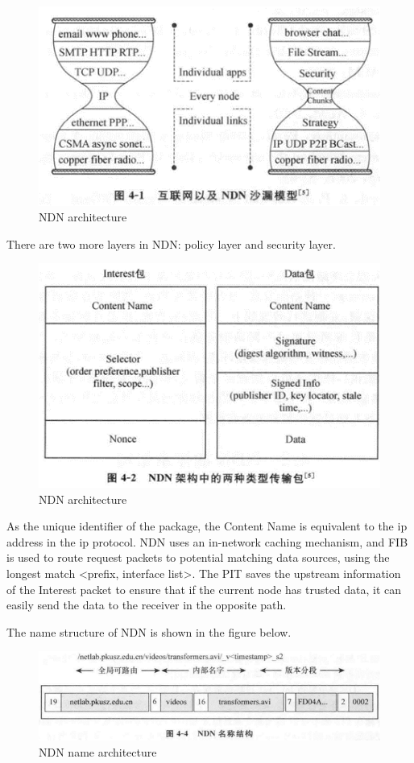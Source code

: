 \documentclass[conference]{IEEEtran}
\begin{document}
\begin{figure}[htbp]
    \centerline{\includegraphics{NDN architecture.png}}
    \caption{NDN architecture}
    \label{fig}
\end{figure}
There are two more layers in NDN: policy layer and security layer.

\begin{figure}[htbp]
    \centerline{\includegraphics{packet.png}}
    \caption{NDN architecture}
    \label{fig}
\end{figure}

As the unique identifier of the package, the Content Name is equivalent to the ip address in the ip protocol.
NDN uses an in-network caching mechanism, and FIB is used to route request packets to potential matching data sources, using the longest match <prefix, interface list>. The PIT saves the upstream information of the Interest packet to ensure that if the current node has trusted data, it can easily send the data to the receiver in the opposite path.


The name structure of NDN is shown in the figure below.
\begin{figure}[htbp]
    \centerline{\includegraphics{NDN name architecture.png}}
    \caption{NDN name architecture}
    \label{fig}
\end{figure}
\end{document}
